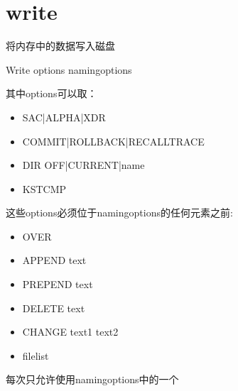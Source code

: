 \section{write}
\label{cmd:write}

将内存中的数据写入磁盘

Write {options} {namingoptions}

其中options可以取：
\begin{itemize}
\item SAC|ALPHA|XDR
\item COMMIT|ROLLBACK|RECALLTRACE  
\item DIR OFF|CURRENT|name  
\item KSTCMP
\end{itemize}
这些options必须位于namingoptions的任何元素之前:
\begin{itemize}
\item OVER  
\item APPEND text  
\item PREPEND text  
\item DELETE text  
\item CHANGE text1 text2  
\item filelist  
\end{itemize}
每次只允许使用namingoptions中的一个

